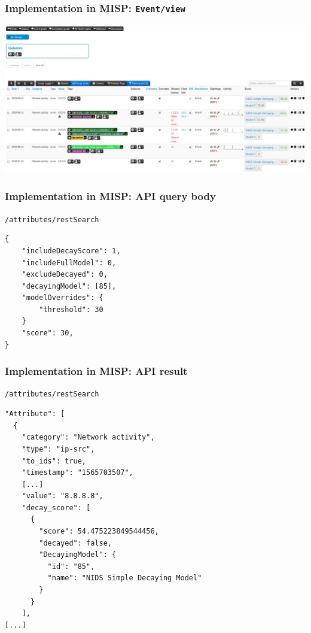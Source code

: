 \begin{frame}
    \frametitle{Implementation in MISP: \texttt{Event/view}}
    \includegraphics[width=1.00\linewidth]{pics/decaying-event.png}
\end{frame}

\begin{frame}[fragile]
    \frametitle{Implementation in MISP: API query body}
    \texttt{/attributes/restSearch}
    \begin{lstlisting}
{
    "includeDecayScore": 1,
    "includeFullModel": 0,
    "excludeDecayed": 0,
    "decayingModel": [85],
    "modelOverrides": {
        "threshold": 30
    }
    "score": 30,
}
    \end{lstlisting}
\end{frame}

\begin{frame}[fragile]
    \frametitle{Implementation in MISP: API result}
    \texttt{/attributes/restSearch}
    \begin{lstlisting}
"Attribute": [
  {
    "category": "Network activity",
    "type": "ip-src",
    "to_ids": true,
    "timestamp": "1565703507",
    [...]
    "value": "8.8.8.8",
    "decay_score": [
      {
        "score": 54.475223849544456,
        "decayed": false,
        "DecayingModel": {
          "id": "85",
          "name": "NIDS Simple Decaying Model"
        }
      }
    ],
[...]
    \end{lstlisting}
\end{frame}

